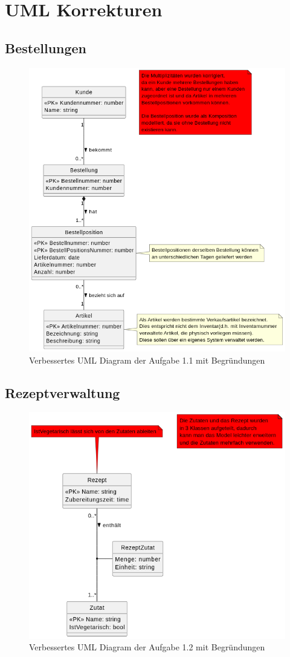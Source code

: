 \documentclass[12pt]{scrartcl}
\begin{document}
\section{UML Korrekturen}
\subsection{Bestellungen}
\begin{figure}[h]
    \centering
    \includegraphics[width=0.9\linewidth]{../UE1_1_1.png}
    \caption{Verbessertes UML Diagram der Aufgabe 1.1 mit Begründungen}
\end{figure}
\pagebreak
\subsection{Rezeptverwaltung}
\begin{figure}[h]
    \centering
    \includegraphics[width=0.9\linewidth]{../UE1_1_2.png}
    \caption{Verbessertes UML Diagram der Aufgabe 1.2 mit Begründungen}
\end{figure}
\pagebreak
\end{document}
